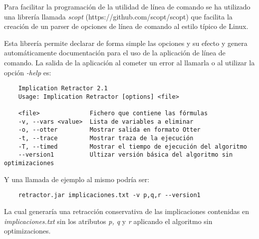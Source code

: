 	Para facilitar la programación de la utilidad de línea de comando se ha utilizado una librería llamada \textit{scopt} (https://github.com/scopt/scopt) que facilita la creación de un parser de opciones de línea de comando al estilo típico de Linux.
	
	Esta librería permite declarar de forma simple las opciones y su efecto y genera automáticamente documentación para el uso de la aplicación de línea de comando. La salida de la aplicación al cometer un error al llamarla o al utilizar la opción \textit{-help} es:


	\begin{verbatim}
	Implication Retractor 2.1
	Usage: Implication Retractor [options] <file>
	
	<file>              Fichero que contiene las fórmulas
	-v, --vars <value>  Lista de variables a eliminar
	-o, --otter         Mostrar salida en formato Otter
	-t, --trace         Mostrar traza de la ejecución
	-T, --timed         Mostrar el tiempo de ejecución del algoritmo
	--version1          Ultizar versión básica del algoritmo sin optimizaciones
	\end{verbatim}
	
	Y una llamada de ejemplo al mismo podría ser:
	
	\begin{verbatim}
	retractor.jar implicaciones.txt -v p,q,r --version1
	\end{verbatim}
	
	La cual generaría una retracción conservativa de las implicaciones contenidas en \textit{implicaciones.txt} sin los atributos \textit{p, q} y \textit{r} aplicando el algoritmo sin optimizaciones. 
	
	
		
		
	
	
	
	
	
	
	
	
	
	
	
	
	
	